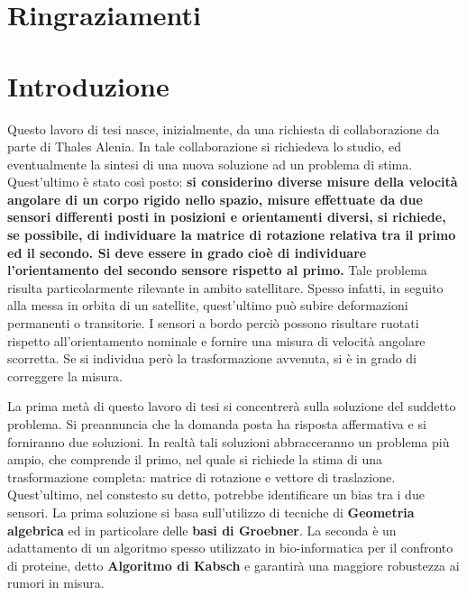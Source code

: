 \chapter*{Ringraziamenti}



\chapter*{Introduzione}

Questo lavoro di tesi nasce, inizialmente, da una richiesta di collaborazione da parte di Thales Alenia. In tale collaborazione si richiedeva lo studio, ed eventualmente la sintesi di una nuova soluzione ad un problema di stima. Quest'ultimo è stato così posto: \textbf{si considerino diverse misure della velocità angolare di un corpo rigido nello spazio, misure effettuate da due sensori differenti posti in posizioni e orientamenti diversi, si richiede, se possibile, di individuare la matrice di rotazione relativa tra il primo ed il secondo. Si deve essere in grado cioè di individuare l'orientamento del secondo sensore rispetto al primo.} Tale problema risulta particolarmente rilevante in ambito satellitare. Spesso infatti, in seguito alla messa in orbita di un satellite, quest'ultimo può subire deformazioni permanenti o transitorie. I sensori a bordo perciò possono risultare ruotati rispetto all'orientamento nominale e fornire una misura di velocità angolare scorretta. Se si individua però la trasformazione avvenuta, si è in grado di correggere la misura.

La prima metà di questo lavoro di tesi si concentrerà sulla soluzione del suddetto problema. Si preannuncia che la domanda posta ha risposta affermativa e si forniranno due soluzioni. In realtà tali soluzioni abbracceranno un problema più ampio, che comprende il primo, nel quale si richiede la stima di una trasformazione completa: matrice di rotazione e vettore di traslazione. Quest'ultimo, nel constesto su detto, potrebbe identificare un bias tra i due sensori. 
La prima soluzione si basa sull'utilizzo di tecniche di \textbf{Geometria algebrica} ed in particolare delle \textbf{basi di Groebner}. La seconda è un adattamento di un algoritmo spesso utilizzato in bio-informatica per il confronto di proteine, detto \textbf{Algoritmo di Kabsch} e garantirà una maggiore robustezza ai rumori in misura.

